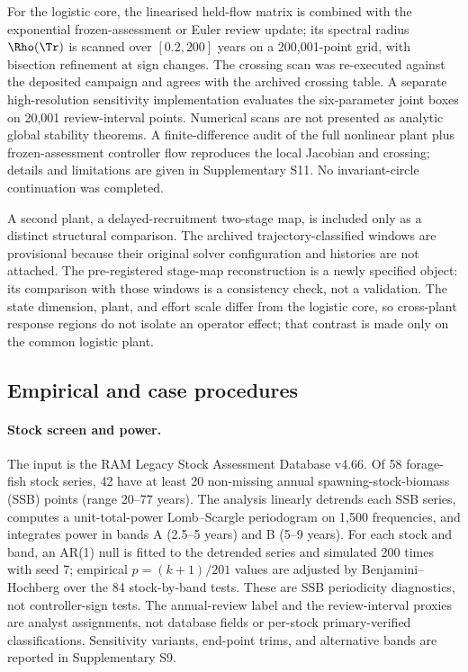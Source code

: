For the logistic core, the linearised held-flow matrix is combined with the exponential frozen-assessment or Euler review update; its spectral radius \(\Rho(\Tr)\) is scanned over \([0.2,200]\) years on a 200,001-point grid, with bisection refinement at sign changes. The crossing scan was re-executed against the deposited campaign and agrees with the archived crossing table. A separate high-resolution sensitivity implementation evaluates the six-parameter joint boxes on 20,001 review-interval points. Numerical scans are not presented as analytic global stability theorems. A finite-difference audit of the full nonlinear plant plus frozen-assessment controller flow reproduces the local Jacobian and crossing; details and limitations are given in Supplementary S11. No invariant-circle continuation was completed.

A second plant, a delayed-recruitment two-stage map, is included only as a distinct structural comparison. The archived trajectory-classified windows are provisional because their original solver configuration and histories are not attached. The pre-registered stage-map reconstruction is a newly specified object: its comparison with those windows is a consistency check, not a validation. The state dimension, plant, and effort scale differ from the logistic core, so cross-plant response regions do not isolate an operator effect; that contrast is made only on the common logistic plant.

\subsection{Empirical and case procedures}\label{sec:empirical-methods}

\paragraph{Stock screen and power.} The input is the RAM Legacy Stock Assessment Database v4.66. Of 58 forage-fish stock series, 42 have at least 20 non-missing annual spawning-stock-biomass (SSB) points (range 20--77 years). The analysis linearly detrends each SSB series, computes a unit-total-power Lomb--Scargle periodogram on 1,500 frequencies, and integrates power in bands A (2.5--5 years) and B (5--9 years). For each stock and band, an AR(1) null is fitted to the detrended series and simulated 200 times with seed 7; empirical \(p=(k+1)/201\) values are adjusted by Benjamini--Hochberg over the 84 stock-by-band tests. These are SSB periodicity diagnostics, not controller-sign tests. The annual-review label and the review-interval proxies are analyst assignments, not database fields or per-stock primary-verified classifications. Sensitivity variants, end-point trims, and alternative bands are reported in Supplementary S9.

